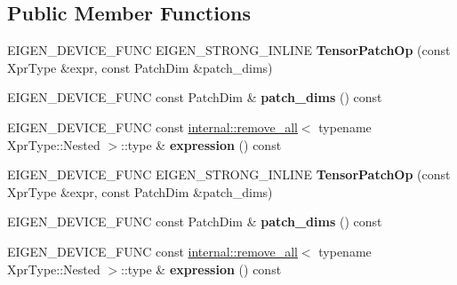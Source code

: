 \subsection*{Public Member Functions}
\begin{DoxyCompactItemize}
\item 
\mbox{\label{class_eigen_1_1_tensor_patch_op_a304c29591beee63abca9f6b13088bb20}} 
E\+I\+G\+E\+N\+\_\+\+D\+E\+V\+I\+C\+E\+\_\+\+F\+U\+NC E\+I\+G\+E\+N\+\_\+\+S\+T\+R\+O\+N\+G\+\_\+\+I\+N\+L\+I\+NE {\bfseries Tensor\+Patch\+Op} (const Xpr\+Type \&expr, const Patch\+Dim \&patch\+\_\+dims)
\item 
\mbox{\label{class_eigen_1_1_tensor_patch_op_afe1409881f554a9b73162b562ffae75a}} 
E\+I\+G\+E\+N\+\_\+\+D\+E\+V\+I\+C\+E\+\_\+\+F\+U\+NC const Patch\+Dim \& {\bfseries patch\+\_\+dims} () const
\item 
\mbox{\label{class_eigen_1_1_tensor_patch_op_af363fce6afdc801a3ff32aad6826484c}} 
E\+I\+G\+E\+N\+\_\+\+D\+E\+V\+I\+C\+E\+\_\+\+F\+U\+NC const \hyperlink{struct_eigen_1_1internal_1_1remove__all}{internal\+::remove\+\_\+all}$<$ typename Xpr\+Type\+::\+Nested $>$\+::type \& {\bfseries expression} () const
\item 
\mbox{\label{class_eigen_1_1_tensor_patch_op_a304c29591beee63abca9f6b13088bb20}} 
E\+I\+G\+E\+N\+\_\+\+D\+E\+V\+I\+C\+E\+\_\+\+F\+U\+NC E\+I\+G\+E\+N\+\_\+\+S\+T\+R\+O\+N\+G\+\_\+\+I\+N\+L\+I\+NE {\bfseries Tensor\+Patch\+Op} (const Xpr\+Type \&expr, const Patch\+Dim \&patch\+\_\+dims)
\item 
\mbox{\label{class_eigen_1_1_tensor_patch_op_afe1409881f554a9b73162b562ffae75a}} 
E\+I\+G\+E\+N\+\_\+\+D\+E\+V\+I\+C\+E\+\_\+\+F\+U\+NC const Patch\+Dim \& {\bfseries patch\+\_\+dims} () const
\item 
\mbox{\label{class_eigen_1_1_tensor_patch_op_af363fce6afdc801a3ff32aad6826484c}} 
E\+I\+G\+E\+N\+\_\+\+D\+E\+V\+I\+C\+E\+\_\+\+F\+U\+NC const \hyperlink{struct_eigen_1_1internal_1_1remove__all}{internal\+::remove\+\_\+all}$<$ typename Xpr\+Type\+::\+Nested $>$\+::type \& {\bfseries expression} () const
\end{DoxyCompactItemize}
